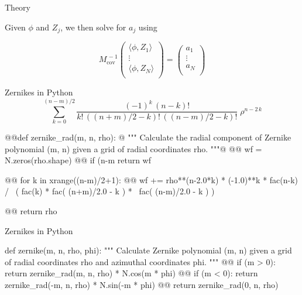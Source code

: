 \documentclass[xetex,10pt]{beamer}
\def\spacer{\vspace*{1em}}
\begin{document}
\begin{frame}[fragile]{Theory}
	
	Given $\phi$ and $Z_j$, we then solve for $a_j$ using
	
	\spacer

	\[
	 M_{\mathrm{cov}}^{\,-1} 
	 \begin{pmatrix}
	 \langle \phi,Z_1 \rangle \\
	 \vdots \\
	 \langle \phi,Z_N \rangle \\
	 \end{pmatrix}
	 =
	 \begin{pmatrix}
	 a_1 \\
	 \vdots \\
	 a_N \\
	 \end{pmatrix}
	\]

\end{frame}

\begin{frame}[fragile]{Zernikes in Python}
	\[
	\sum_{k=0}^{(n-m)/2} \!\!\! \frac{(-1)^k\,(n-k)!}{k!\,((n+m)/2-k)!\,((n-m)/2-k)!} \;\rho^{n-2\,k}
	\]
\begin{python}
@@def zernike_rad(m, n, rho):
@  """
  Calculate the radial component of Zernike polynomial (m, n) 
  given a grid of radial coordinates rho.
  """@
@@  wf = N.zeros(rho.shape)
@@  if (n-m %
    return wf
  
@@  for k in xrange((n-m)/2+1):
@@    wf += rho**(n-2.0*k) * (-1.0)**k * fac(n-k) / \
    	( fac(k) * fac( (n+m)/2.0 - k ) * \
      fac( (n-m)/2.0 - k ) )
  
@@  return rho
\end{python}
\end{frame}

\begin{frame}[fragile]{Zernikes in Python}
\begin{python}
def zernike(m, n, rho, phi):
  """
  Calculate Zernike polynomial (m, n) given a grid of radial
  coordinates rho and azimuthal coordinates phi.
  """
@@  if (m > 0): return zernike_rad(m, n, rho) * N.cos(m * phi)
@@  if (m < 0): return zernike_rad(-m, n, rho) * N.sin(-m * phi)
@@  return zernike_rad(0, n, rho)
\end{python}
\end{frame}
\end{document}
